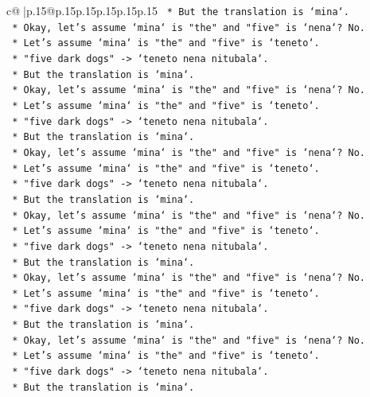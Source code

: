 \documentclass{article}
\begin{document}
{\begin{supertabular}{c@{$\;$}|p{.15\linewidth}@{}p{.15\linewidth}p{.15\linewidth}p{.15\linewidth}p{.15\linewidth}p{.15\linewidth}}
{{{\texttt{    *   But the translation is `mina`.} \\
\texttt{    *   Okay, let's assume `mina` is "the" and "five" is `nena`? No.} \\
\texttt{    *   Let's assume `mina` is "the" and "five" is `teneto`.} \\
\texttt{    *   "five dark dogs" {-}> `teneto nena nitubala`.} \\
\texttt{    *   But the translation is `mina`.} \\
\texttt{    *   Okay, let's assume `mina` is "the" and "five" is `nena`? No.} \\
\texttt{    *   Let's assume `mina` is "the" and "five" is `teneto`.} \\
\texttt{    *   "five dark dogs" {-}> `teneto nena nitubala`.} \\
\texttt{    *   But the translation is `mina`.} \\
\texttt{    *   Okay, let's assume `mina` is "the" and "five" is `nena`? No.} \\
\texttt{    *   Let's assume `mina` is "the" and "five" is `teneto`.} \\
\texttt{    *   "five dark dogs" {-}> `teneto nena nitubala`.} \\
\texttt{    *   But the translation is `mina`.} \\
\texttt{    *   Okay, let's assume `mina` is "the" and "five" is `nena`? No.} \\
\texttt{    *   Let's assume `mina` is "the" and "five" is `teneto`.} \\
\texttt{    *   "five dark dogs" {-}> `teneto nena nitubala`.} \\
\texttt{    *   But the translation is `mina`.} \\
\texttt{    *   Okay, let's assume `mina` is "the" and "five" is `nena`? No.} \\
\texttt{    *   Let's assume `mina` is "the" and "five" is `teneto`.} \\
\texttt{    *   "five dark dogs" {-}> `teneto nena nitubala`.} \\
\texttt{    *   But the translation is `mina`.} \\
\texttt{    *   Okay, let's assume `mina` is "the" and "five" is `nena`? No.} \\
\texttt{    *   Let's assume `mina` is "the" and "five" is `teneto`.} \\
\texttt{    *   "five dark dogs" {-}> `teneto nena nitubala`.} \\
\texttt{    *   But the translation is `mina`.} \\
}}}
\end{supertabular}}
\end{document}
